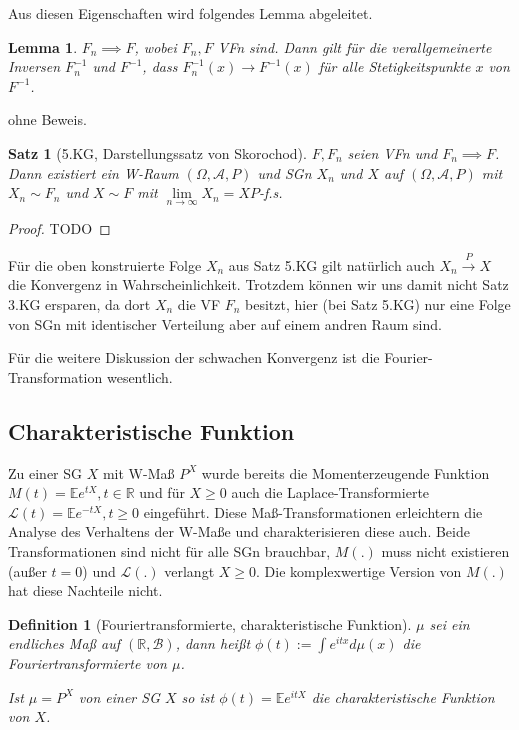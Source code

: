 \documentclass[]{article}
\newtheorem{theorem}{Satz}
\newtheorem{lemma}{Lemma}
\newtheorem{definition}{Definition}
\begin{document}
Aus diesen Eigenschaften wird folgendes Lemma abgeleitet.
\begin{lemma}
	$F_n\implies F$, wobei $F_n, F$ VFn sind. Dann gilt für die verallgemeinerte Inversen $F_n^{-1}$ und $F^{-1}$, dass $F_n^{-1}(x)\rightarrow F^{-1}(x)$ für alle Stetigkeitspunkte $x$ von $F^{-1}$.
\end{lemma}

ohne Beweis.

\begin{theorem}[5.KG, Darstellungssatz von Skorochod]
	$F, F_n$ seien VFn und $F_n\implies F$. Dann existiert ein W-Raum $(\Omega, \mathcal{A}, P)$ und SGn $X_n$ und $X$ auf $(\Omega, \mathcal{A}, P)$ mit $X_n\sim F_n$ und $X\sim F$ mit $\lim\limits_{n\rightarrow\infty}X_n = X P$-f.s.
\end{theorem}

\begin{proof}
	TODO
\end{proof}

Für die oben konstruierte Folge $X_n$ aus Satz 5.KG gilt natürlich auch $X_n\xrightarrow{P}X$ die Konvergenz in Wahrscheinlichkeit. Trotzdem können wir uns damit nicht Satz 3.KG ersparen, da dort $X_n$ die VF $F_n$ besitzt, hier (bei Satz 5.KG) nur eine Folge von SGn mit identischer Verteilung aber auf einem andren Raum sind.

Für die weitere Diskussion der schwachen Konvergenz ist die Fourier-Transformation wesentlich.

\subsection{Charakteristische Funktion}
Zu einer SG $X$ mit W-Maß $P^X$ wurde bereits die Momenterzeugende Funktion $M(t)=\mathbb{E}e^{tX}, t\in \mathbb{R}$ und für $X\geq 0$ auch die Laplace-Transformierte $\mathcal{L}(t)=\mathbb{E}e^{-tX}, t \geq 0$ eingeführt. Diese Maß-Transformationen erleichtern die Analyse des Verhaltens der W-Maße und charakterisieren diese auch. Beide Transformationen sind nicht für alle SGn brauchbar, $M(.)$ muss nicht existieren (außer $t=0$) und $\mathcal{L}(.)$ verlangt $X\geq 0$. Die komplexwertige Version von $M(.)$ hat diese Nachteile nicht.

\begin{definition}[Fouriertransformierte, charakteristische Funktion]
	$\mu$ sei ein endliches Maß auf $(\mathbb{R}, \mathcal{B})$, dann heißt $\phi(t):=\int e^{itx} d\mu(x)$ die Fouriertransformierte von $\mu$.
	
	Ist $\mu=P^X$ von einer SG $X$ so ist $\phi(t)=\mathbb{E}e^{itX}$ die charakteristische Funktion von $X$.
\end{definition}
\end{document}
